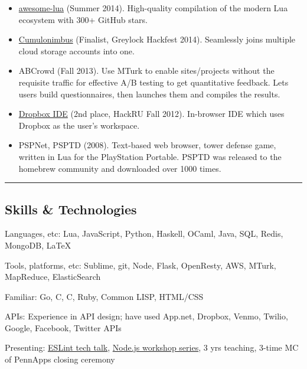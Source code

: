 \documentclass[10pt,letterpaper]{article}
\newenvironment{indentsection}[1]%
{\begin{list}{}%
	{\setlength{\leftmargin}{#1}}%
	\item[]%
}
{\end{list}}
\newcommand{\CPP}
{C\nolinebreak[4]\hspace{-.05em}\raisebox{.22ex}{\footnotesize\bf ++}}
\begin{document}
\begin{itemize}
	\parskip=-0.1em

	\item
	\href{https://github.com/LewisJEllis/awesome-lua}{awesome-lua} (Summer 2014). High-quality compilation of the modern Lua ecosystem with 300+ GitHub stars.
	\item
	\href{https://github.com/maxscheiber/cumulonimbus}{Cumulonimbus} (Finalist, Greylock Hackfest 2014). Seamlessly joins multiple cloud storage accounts into one.
	\item
	ABCrowd (Fall 2013). Use MTurk to enable sites/projects without the requisite traffic for effective A/B testing to get quantitative feedback. Lets users build questionnaires, then launches them and compiles the results.
	\item
	\href{https://github.com/yefim/DBIDE}{Dropbox IDE} (2nd place, HackRU Fall 2012). In-browser IDE which uses Dropbox as the user's workspace.
	\item
	PSPNet, PSPTD (2008). Text-based web browser, tower defense game, written in Lua for the PlayStation Portable. PSPTD was released to the homebrew community and downloaded over 1000 times.
\end{itemize}


\hrule
\vspace{-0.7em}
\subsection*{Skills \& Technologies}

\begin{indentsection}{\parindent}
\begin{description*}
	\item[Languages, etc:]
	Lua, JavaScript, Python, Haskell, OCaml, Java, SQL, Redis, MongoDB, \LaTeX
	\item[Tools, platforms, etc:] Sublime, git, Node, Flask, OpenResty, AWS, MTurk, MapReduce, ElasticSearch
	\item[Familiar:] Go, C, \CPP, Ruby, Common LISP, HTML/CSS
	\item[APIs:] Experience in API design; have used App.net, Dropbox, Venmo, Twilio, Google, Facebook, Twitter APIs
	\item[Presenting:] \href{https://github.com/LewisJEllis/eslint101}{ESLint tech talk}, \href{https://github.com/LewisJEllis/nodejs-workshops}{Node.js workshop series}, 3 yrs teaching, 3-time MC of PennApps closing ceremony
\end{description*}
\end{indentsection}
\end{document}
